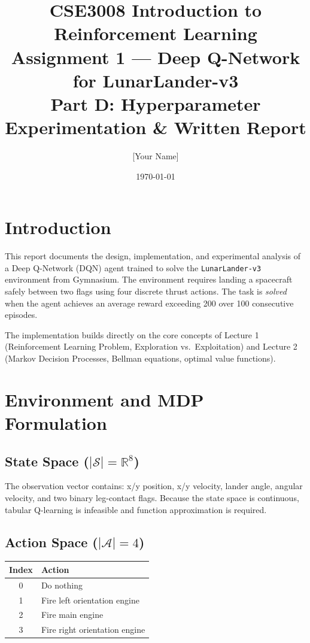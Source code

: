 \documentclass[11pt,a4paper]{article}
\title{%
  \textbf{CSE3008 Introduction to Reinforcement Learning}\\[4pt]
  Assignment 1 — Deep Q-Network for LunarLander-v3\\[4pt]
  \large Part D: Hyperparameter Experimentation \& Written Report
}
\author{[Your Name] \\ [Student ID]}
\date{\today}
\begin{document}
\maketitle
\tableofcontents
\newpage

\section{Introduction}

This report documents the design, implementation, and experimental
analysis of a Deep Q-Network (DQN) agent trained to solve the
\texttt{LunarLander-v3} environment from Gymnasium.  The environment
requires landing a spacecraft safely between two flags using four
discrete thrust actions.  The task is \emph{solved} when the agent
achieves an average reward exceeding 200 over 100 consecutive episodes.

The implementation builds directly on the core concepts of Lecture 1
(Reinforcement Learning Problem, Exploration vs.\ Exploitation) and
Lecture 2 (Markov Decision Processes, Bellman equations, optimal value
functions).

\section{Environment and MDP Formulation}

\subsection*{State Space ($|\mathcal{S}| = \mathbb{R}^8$)}
The observation vector contains: x/y position, x/y velocity,
lander angle, angular velocity, and two binary leg-contact flags.
Because the state space is continuous, tabular Q-learning is
infeasible and function approximation is required.

\subsection*{Action Space ($|\mathcal{A}| = 4$)}
\begin{center}
\begin{tabular}{cl}
\toprule
Index & Action \\
\midrule
0 & Do nothing \\
1 & Fire left orientation engine \\
2 & Fire main engine \\
3 & Fire right orientation engine \\
\bottomrule
\end{tabular}
\end{center}
\end{document}
